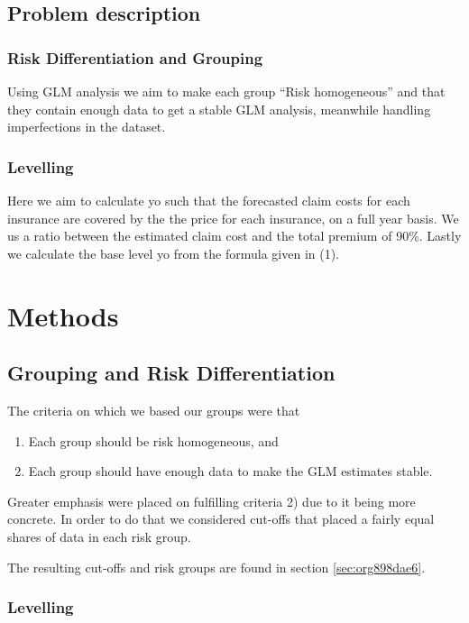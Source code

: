 \documentclass[11pt]{article}
\begin{document}
\subsection{Problem description}
\label{sec:org0d20bb8}
\subsubsection{Risk Differentiation and Grouping}
\label{sec:orgff1afec}

Using GLM analysis we aim to make each group “Risk homogeneous” and that they contain enough data to
get a stable GLM analysis, meanwhile handling imperfections in the dataset.

\subsubsection{Levelling}
\label{sec:org2434c16}

Here we aim to calculate yo such that the forecasted claim costs for each insurance are covered by the
the price for each insurance, on a full year basis. We us a ratio between the estimated claim cost and
the total premium of 90\%. Lastly we calculate the base level yo from the formula given in (1).

\section{Methods}
\label{sec:orge528f3b}
\subsection{Grouping and Risk Differentiation}
\label{sec:org6ae7275}

The criteria on which we based our groups were that

\begin{enumerate}
\item Each group should be risk homogeneous, and
\item Each group should have enough data to make the GLM estimates stable.
\end{enumerate}
Greater emphasis were placed on fulfilling criteria 2) due to it being more concrete.
In order to do that we considered cut-offs that placed a fairly equal shares of data in 
each risk group. 

The resulting cut-offs and risk groups are found in section \ref{sec:org898dae6}.

\subsubsection{Levelling}
\label{sec:org1383086}
\end{document}
